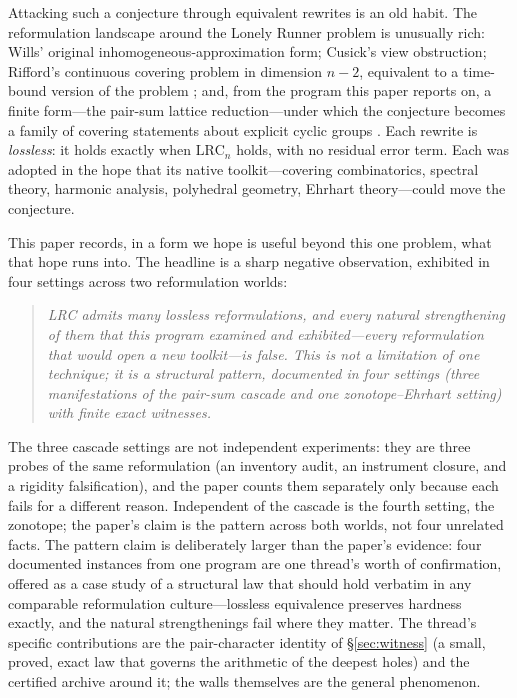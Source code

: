 \documentclass[11pt,a4paper]{article}
\numberwithin{equation}{section}
\theoremstyle{plain}
\theoremstyle{definition}
\theoremstyle{remark}
\newcommand{\lrc}{\mathrm{LRC}}
\begin{document}
Attacking such a conjecture through equivalent rewrites is an old habit.
The reformulation landscape around the Lonely Runner problem is unusually
rich: Wills' original inhomogeneous-approximation form; Cusick's view
obstruction; Rifford's continuous covering problem in dimension $n-2$,
equivalent to a time-bound version of the problem \cite{Rifford}; and, from
the program this paper reports on, a finite form---the pair-sum lattice
reduction---under which the conjecture becomes a family of covering
statements about explicit cyclic groups \cite{PS-survey,prog-artifacts}.
Each rewrite is \emph{lossless}: it holds exactly when $\lrc_n$ holds,
with no residual error term. Each was adopted in the hope that its native
toolkit---covering combinatorics, spectral theory, harmonic analysis,
polyhedral geometry, Ehrhart theory---could move the conjecture.

This paper records, in a form we hope is useful beyond this one problem,
what that hope runs into. The headline is a sharp negative observation,
exhibited in four settings across two reformulation worlds:

\begin{quote}
\emph{LRC admits many lossless reformulations, and every natural
strengthening of them that this program examined and exhibited---every
reformulation that would open a new toolkit---is false. This is not a
limitation of one technique; it is a structural pattern, documented in
four settings (three manifestations of the pair-sum cascade and one
zonotope--Ehrhart setting) with finite exact witnesses.}
\end{quote}

The three cascade settings are not independent experiments: they are three
probes of the same reformulation (an inventory audit, an instrument
closure, and a rigidity falsification), and the paper counts them
separately only because each fails for a different reason. Independent of
the cascade is the fourth setting, the zonotope; the paper's claim is the
pattern across both worlds, not four unrelated facts. The pattern claim
is deliberately larger than the paper's evidence: four documented
instances from one program are one thread's worth of confirmation,
offered as a case study of a structural law that should hold verbatim in
any comparable reformulation culture---lossless equivalence preserves
hardness exactly, and the natural strengthenings fail where they matter.
The thread's specific contributions are the pair-character identity of
\S\ref{sec:witness} (a small, proved, exact law that governs the
arithmetic of the deepest holes) and the certified archive around it;
the walls themselves are the general phenomenon.
\end{document}
